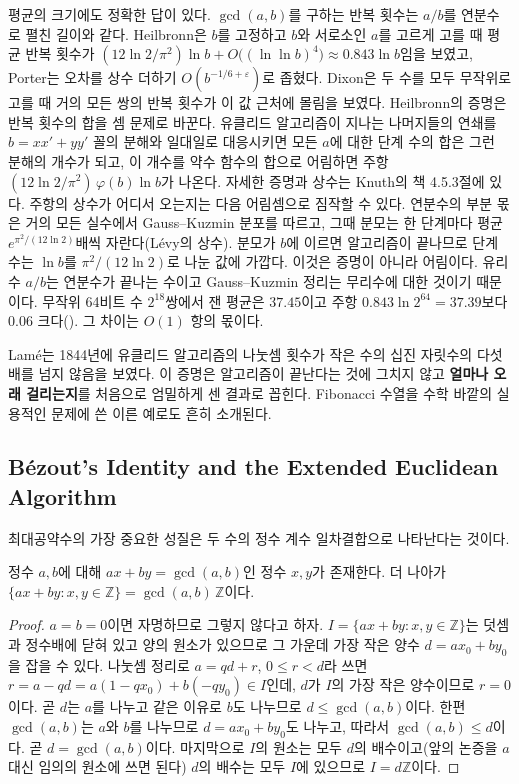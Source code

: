 평균의 크기에도 정확한 답이 있다. $\gcd(a,b)$를 구하는 반복 횟수는 $a/b$를 연분수로 펼친 길이와 같다. Heilbronn은 $b$를 고정하고 $b$와 서로소인 $a$를 고르게 고를 때 평균 반복 횟수가 $(12\ln2/\pi^2)\ln b+O\bigl((\ln\ln b)^4\bigr)\approx0.843\ln b$임을 보였고, Porter는 오차를 상수 더하기 $O(b^{-1/6+\varepsilon})$로 좁혔다. Dixon은 두 수를 모두 무작위로 고를 때 거의 모든 쌍의 반복 횟수가 이 값 근처에 몰림을 보였다. Heilbronn의 증명은 반복 횟수의 합을 셈 문제로 바꾼다. 유클리드 알고리즘이 지나는 나머지들의 연쇄를 $b=xx'+yy'$ 꼴의 분해와 일대일로 대응시키면 모든 $a$에 대한 단계 수의 합은 그런 분해의 개수가 되고, 이 개수를 약수 함수의 합으로 어림하면 주항 $(12\ln2/\pi^2)\,\varphi(b)\ln b$가 나온다. 자세한 증명과 상수는 Knuth의 책 4.5.3절에 있다\cite{knuth1997taocp2}. 주항의 상수가 어디서 오는지는 다음 어림셈으로 짐작할 수 있다. 연분수의 부분 몫은 거의 모든 실수에서 Gauss–Kuzmin 분포를 따르고, 그때 분모는 한 단계마다 평균 $e^{\pi^2/(12\ln2)}$배씩 자란다(Lévy의 상수). 분모가 $b$에 이르면 알고리즘이 끝나므로 단계 수는 $\ln b$를 $\pi^2/(12\ln2)$로 나눈 값에 가깝다. 이것은 증명이 아니라 어림이다. 유리수 $a/b$는 연분수가 끝나는 수이고 Gauss–Kuzmin 정리는 무리수에 대한 것이기 때문이다. 무작위 64비트 수 $2^{18}$쌍에서 잰 평균은 $37.45$이고 주항 $0.843\ln2^{64}=37.39$보다 $0.06$ 크다(). 그 차이는 $O(1)$ 항의 몫이다.

\begin{aside}
Lamé는 1844년에 유클리드 알고리즘의 나눗셈 횟수가 작은 수의 십진 자릿수의 다섯 배를 넘지 않음을 보였다. 이 증명은 알고리즘이 끝난다는 것에 그치지 않고 \textbf{얼마나 오래 걸리는지}를 처음으로 엄밀하게 센 결과로 꼽힌다. Fibonacci 수열을 수학 바깥의 실용적인 문제에 쓴 이른 예로도 흔히 소개된다\cite{knuth1997taocp2}.
\end{aside}

\subsection{B\'ezout's Identity and the Extended Euclidean Algorithm}

최대공약수의 가장 중요한 성질은 두 수의 정수 계수 일차결합으로 나타난다는 것이다.

\begin{theorem}[Bézout]
\label{thm:bezout}
정수 $a,b$에 대해 $ax+by=\gcd(a,b)$인 정수 $x,y$가 존재한다. 더 나아가 $\{ax+by:x,y\in\mathbb{Z}\}=\gcd(a,b)\,\mathbb{Z}$이다.
\end{theorem}

\begin{proof}
$a=b=0$이면 자명하므로 그렇지 않다고 하자. $I=\{ax+by:x,y\in\mathbb{Z}\}$는 덧셈과 정수배에 닫혀 있고 양의 원소가 있으므로 그 가운데 가장 작은 양수 $d=ax_0+by_0$을 잡을 수 있다. 나눗셈 정리로 $a=qd+r$, $0\le r<d$라 쓰면 $r=a-qd=a(1-qx_0)+b(-qy_0)\in I$인데, $d$가 $I$의 가장 작은 양수이므로 $r=0$이다. 곧 $d$는 $a$를 나누고 같은 이유로 $b$도 나누므로 $d\le\gcd(a,b)$이다. 한편 $\gcd(a,b)$는 $a$와 $b$를 나누므로 $d=ax_0+by_0$도 나누고, 따라서 $\gcd(a,b)\le d$이다. 곧 $d=\gcd(a,b)$이다. 마지막으로 $I$의 원소는 모두 $d$의 배수이고(앞의 논증을 $a$ 대신 임의의 원소에 쓰면 된다) $d$의 배수는 모두 $I$에 있으므로 $I=d\mathbb{Z}$이다.
\end{proof}

